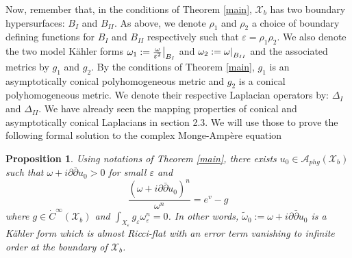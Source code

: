 \documentclass[a4paper,11pt]{article}
\newcounter{mythm}[section]
\newtheorem{pr}[mythm]{Proposition}
\newcommand\restr[2]{{%
  \left.\kern-\nulldelimiterspace %
  #1 %
  \littletaller %
  \right|_{#2} %
  }}
\newcommand{\littletaller}{\mathchoice{\vphantom{\big|}}{}{}{}}
\begin{document}
 Now, remember that, in the conditions of Theorem \ref{main},  $\mathcal{X}_b$ has two boundary hypersurfaces: $B_{I}$ and $B_{II}$. As above, we denote $\rho_1$ and $\rho_2$ a choice of boundary defining functions for $B_{I}$ and $B_{II}$ respectively such that $\varepsilon = \rho_1 \rho_2$. We also denote the two model Kähler forms $\omega_1 := \restr{\frac{\omega}{\varepsilon^2}}{B_{I}}$ and $\omega_2 := \restr{\omega}{B_{II}}$ and the associated metrics by $g_1$ and $g_2$. By the conditions of Theorem \ref{main}, $g_1$ is an asymptotically conical polyhomogeneous metric and $g_2$ is a conical polyhomogeneous metric. We denote their respective Laplacian operators by: $\Delta_{I}$ and $\Delta_{II}$. We have already seen the mapping properties of conical and asymptotically conical Laplacians in section 2.3. We will use those to prove the following formal solution to the complex Monge-Ampère equation 
 \begin{pr}
     Using notations of Theorem \ref{main}, there exists $u_0 \in \mathcal{A}_{phg}(\mathcal{X}_b)$ such that $\omega + i \partial \overline{\partial}u_0 >0$ for small $\varepsilon$ and
     $$
\frac{\left(\omega + i \partial \bar{\partial} u_{0}\right)^n}{\omega^n} = e^{v}-g
$$
where $g \in \dot{C}^{\infty} (\mathcal{X}_b)$ and $\int_{X_\varepsilon} g_\varepsilon \omega_\varepsilon^n = 0$. In other words, $\tilde \omega_0:= \omega + i \partial \bar{\partial} u_{0}$ is a Kähler form which is almost Ricci-flat with an error term vanishing to infinite order at the boundary of $\mathcal{X}_b$.
 \end{pr}
\end{document}

